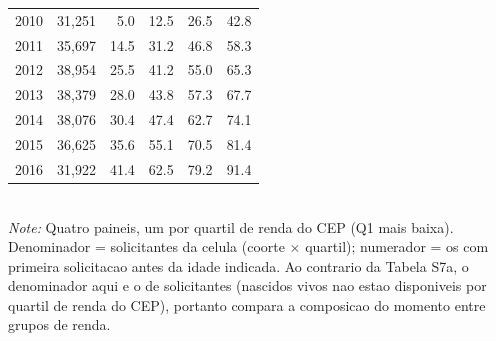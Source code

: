 \begin{table}[htbp]
\begin{tabular}{lrrrrr}
2010 & 31,251 & 5.0 & 12.5 & 26.5 & 42.8 \\
2011 & 35,697 & 14.5 & 31.2 & 46.8 & 58.3 \\
2012 & 38,954 & 25.5 & 41.2 & 55.0 & 65.3 \\
2013 & 38,379 & 28.0 & 43.8 & 57.3 & 67.7 \\
2014 & 38,076 & 30.4 & 47.4 & 62.7 & 74.1 \\
2015 & 36,625 & 35.6 & 55.1 & 70.5 & 81.4 \\
2016 & 31,922 & 41.4 & 62.5 & 79.2 & 91.4 \\
\bottomrule
\end{tabular}
\\[3pt]{\footnotesize \textit{Note:} Quatro paineis, um por quartil de renda do CEP (Q1 mais baixa). Denominador = solicitantes da celula (coorte $\times$ quartil); numerador = os com primeira solicitacao antes da idade indicada. Ao contrario da Tabela S7a, o denominador aqui e o de solicitantes (nascidos vivos nao estao disponiveis por quartil de renda do CEP), portanto compara a composicao do momento entre grupos de renda.}
\end{table}
